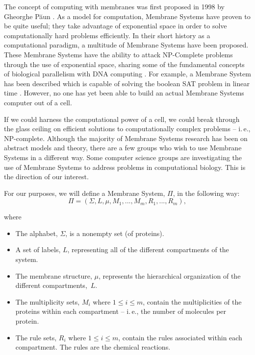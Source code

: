 \documentclass[copyright]{eptcs}
\newcommand{\noi}{\noindent}
\begin{document}
The concept of computing with membranes was first proposed in 1998 by Gheorghe P\u aun \cite{gpaun98}.  As a model for computation, Membrane Systems have proven to be quite useful; they take advantage of exponential space in order to solve computationally hard problems efficiently.  In their short history as a computational paradigm, a multitude of Membrane Systems have been proposed.   These Membrane Systems have the ability to attack NP-Complete problems through the use of exponential space, sharing some of the fundamental concepts of biological parallelism with DNA computing \cite{adleman94}.  For example, a Membrane System has been described which is capable of solving the boolean SAT problem in linear time \cite{ferretti00}. However, no one has yet been able to build an actual Membrane Systems computer out of a cell.

If we could harness the computational power of a cell, we could break through the glass ceiling on efficient solutions to computationally complex problems -- i.\,e., NP-complete.  Although the majority of Membrane Systems research has been on abstract models and theory, there are a few groups who wish to use Membrane Systems in a different way.  Some computer science groups are investigating the use of Membrane Systems to address problems in computational biology.  This is the direction of our interest.

For our purposes, we will define a Membrane System, $\Pi$, in the following way:
\begin{equation}
\Pi = ( \Sigma, L, \mu, M_1,..., M_m, R_1,..., R_m),
\label{Membranesys}
\end{equation}

\noi where
\begin{itemize}
\item The alphabet, $\Sigma$, is a nonempty set (of proteins).
\item A set of labels, $L$, representing all of the different compartments of the system.
\item The membrane structure, $\mu$, represents the hierarchical organization of the 
different compartments,~$L$.
\item The multiplicity sets, $M_i$ where $1\leq i\leq m$, contain the multiplicities of the proteins within each compartment -- i.\,e., the number of molecules per protein.
\item The rule sets, $R_i$ where $1\leq i\leq m$, contain the rules associated within each compartment.  The rules are the chemical reactions.
\end{itemize}
\end{document}
